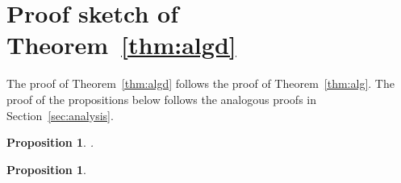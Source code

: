 \documentclass[11pt]{article}
\newtheorem{proposition}[theorem]{Proposition}
\newenvironment{proof sketch}[1]{\noindent {\emph{Proof sketch of #1:}}}{\hfill \qed}
\begin{document}
\begin{comment}
\section{Partial Tiles for }\label{appendix:partial}

In this appendix we discuss partial tiles for the case of .
In this case the standard drawing of the space-time graph  is -dimensional, thus tiles are cubes.


A cube in the untilted space-time graph is \emph{partial} if it intersects the plane .
When  there are  types of partial cubes as depicted in Figure~\ref{fig:hard-caps}. Note that when  there is only one type of partial cubes.

We now show that partial cubes do not pose a problem to detailed routing. Every detailed path that traverses a cube of Type- must originate from that cube.
Every path that traverses cube of Type- and Type-, has the property that from each entry point the cube seems to be complete. Namely, all reachable nodes exist.

Note that, if a detailed path traverses partial cubes, it traverses them from Type- to Type-, from Type- to Type-, and from Type- to a ``full'' cube.
\begin{figure}[h!]
     \centering
     \texttt{[image: hard-caps3.eps]}
     \caption{ Three types of partial cubes that intersect with the boundary of
        after untilting. The hatched plane corresponds to vertices with  before untilting. Note that a partial tile consists of the vertices that are above the hatched plane. }
     \label{fig:hard-caps}
\end{figure}
\end{comment}

\section{Proof sketch of Theorem~\ref{thm:algd}}\label{sec:proofdd}

The proof of Theorem~\ref{thm:algd} follows the proof of Theorem~\ref{thm:alg}.
The proof of the propositions below follows the analogous proofs in Section~\ref{sec:analysis}.

\begin{proposition}\label{prop:optd}
    .
\end{proposition}

\begin{proposition}\label{prop:scaledd}
    
\end{proposition}
\end{document}
